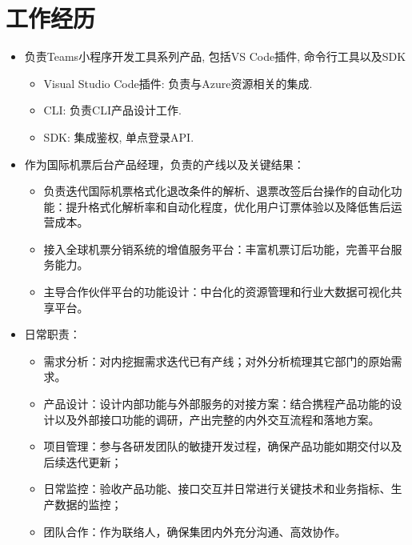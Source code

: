 \documentclass{resume}
\begin{document}
\section{工作经历}
\begin{itemize}
\item {负责Teams小程序开发工具系列产品, 包括VS Code插件, 命令行工具以及SDK}
    \begin{itemize}
        \item Visual Studio Code插件: 负责与Azure资源相关的集成.
        \item CLI: 负责CLI产品设计工作.
        \item SDK: 集成鉴权, 单点登录API.
    \end{itemize}

\end{itemize}
\begin{itemize}
\item {作为国际机票后台产品经理，负责的产线以及关键结果：}
    \begin{itemize}
        \item 负责迭代国际机票格式化退改条件的解析、退票改签后台操作的自动化功能：提升格式化解析率和自动化程度，优化用户订票体验以及降低售后运营成本。
        \item 接入全球机票分销系统的增值服务平台：丰富机票订后功能，完善平台服务能力。
        \item 主导合作伙伴平台的功能设计：中台化的资源管理和行业大数据可视化共享平台。
    \end{itemize}
\item {日常职责：}
    \begin{itemize}
        \item 需求分析：对内挖掘需求迭代已有产线；对外分析梳理其它部门的原始需求。
        \item 产品设计：设计内部功能与外部服务的对接方案：结合携程产品功能的设计以及外部接口功能的调研，产出完整的内外交互流程和落地方案。
        \item 项目管理：参与各研发团队的敏捷开发过程，确保产品功能如期交付以及后续迭代更新；
        \item 日常监控：验收产品功能、接口交互并日常进行关键技术和业务指标、生产数据的监控；
        \item 团队合作：作为联络人，确保集团内外充分沟通、高效协作。
    \end{itemize}

\end{itemize}
\end{document}
